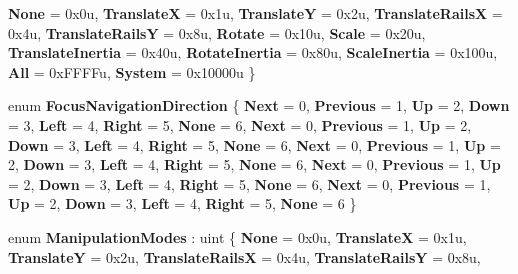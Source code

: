\begin{DoxyCompactItemize}
{\bfseries None} = 0x0u, 
{\bfseries TranslateX} = 0x1u, 
{\bfseries TranslateY} = 0x2u, 
{\bfseries Translate\+RailsX} = 0x4u, 
\newline
{\bfseries Translate\+RailsY} = 0x8u, 
{\bfseries Rotate} = 0x10u, 
{\bfseries Scale} = 0x20u, 
{\bfseries Translate\+Inertia} = 0x40u, 
\newline
{\bfseries Rotate\+Inertia} = 0x80u, 
{\bfseries Scale\+Inertia} = 0x100u, 
{\bfseries All} = 0x\+F\+F\+F\+Fu, 
{\bfseries System} = 0x10000u
 \}
\item 
\mbox{\label{namespace_windows_1_1_u_i_1_1_xaml_1_1_input_a79a24b7b4f6dcfda601ea71a4020fd05}} 
enum {\bfseries Focus\+Navigation\+Direction} \{ \newline
{\bfseries Next} = 0, 
{\bfseries Previous} = 1, 
{\bfseries Up} = 2, 
{\bfseries Down} = 3, 
\newline
{\bfseries Left} = 4, 
{\bfseries Right} = 5, 
{\bfseries None} = 6, 
{\bfseries Next} = 0, 
\newline
{\bfseries Previous} = 1, 
{\bfseries Up} = 2, 
{\bfseries Down} = 3, 
{\bfseries Left} = 4, 
\newline
{\bfseries Right} = 5, 
{\bfseries None} = 6, 
{\bfseries Next} = 0, 
{\bfseries Previous} = 1, 
\newline
{\bfseries Up} = 2, 
{\bfseries Down} = 3, 
{\bfseries Left} = 4, 
{\bfseries Right} = 5, 
\newline
{\bfseries None} = 6, 
{\bfseries Next} = 0, 
{\bfseries Previous} = 1, 
{\bfseries Up} = 2, 
\newline
{\bfseries Down} = 3, 
{\bfseries Left} = 4, 
{\bfseries Right} = 5, 
{\bfseries None} = 6, 
\newline
{\bfseries Next} = 0, 
{\bfseries Previous} = 1, 
{\bfseries Up} = 2, 
{\bfseries Down} = 3, 
\newline
{\bfseries Left} = 4, 
{\bfseries Right} = 5, 
{\bfseries None} = 6
 \}
\item 
\mbox{\label{namespace_windows_1_1_u_i_1_1_xaml_1_1_input_a8c481e845e38fcfb6aa19028f4362554}} 
enum {\bfseries Manipulation\+Modes} \+: uint \{ \newline
{\bfseries None} = 0x0u, 
{\bfseries TranslateX} = 0x1u, 
{\bfseries TranslateY} = 0x2u, 
{\bfseries Translate\+RailsX} = 0x4u, 
\newline
{\bfseries Translate\+RailsY} = 0x8u, 

\end{DoxyCompactItemize}
